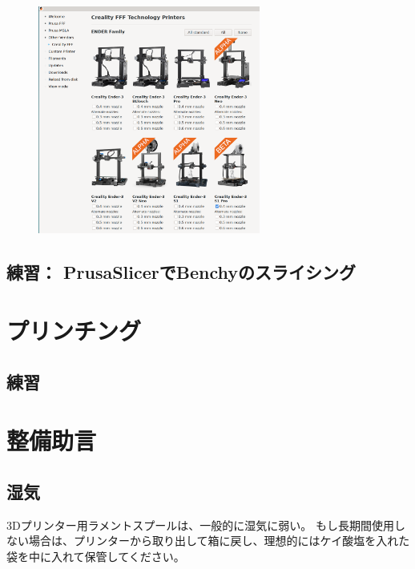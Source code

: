 \documentclass[10pt,a4paper,onecolumn,notitlepage,oneside,dvipdfmx]{article}
\begin{document}
\begin{figure}[htbp]
\centering
\includegraphics[width=0.65\textwidth]{img/ender3_beta.png}
\end{figure}


\subsection{練習： PrusaSlicerでBenchyのスライシング}
\label{sec:org0453fa0}

\pagebreak
\section{プリンチング}
\label{sec:orgf0023fd}
\subsection{練習}
\label{sec:orgc1859ca}

\pagebreak
\section{整備助言}
\label{sec:orged0c559}

\subsection{湿気}
\label{sec:org95bb107}
3Dプリンター用ラメントスプールは、一般的に湿気に弱い。
もし長期間使用しない場合は、プリンターから取り出して箱に戻し、理想的にはケイ酸塩を入れた袋を中に入れて保管してください。
\end{document}
